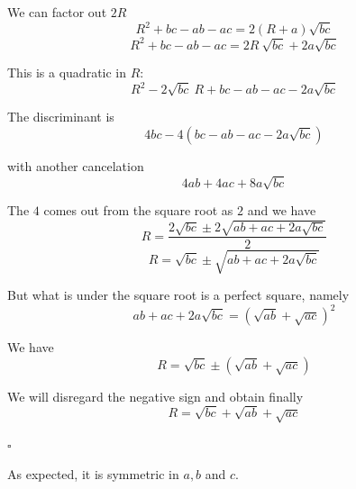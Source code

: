 \documentclass[11pt, oneside]{article}
\begin{document}
We can factor out $2R$
\[ R^2 + bc - ab - ac =  2 (R + a) \sqrt{bc} \]
\[ R^2 + bc - ab - ac =  2R \ \sqrt{bc} + 2a \sqrt{bc} \]

This is a quadratic in $R$:
\[ R^2 - 2 \sqrt{bc} \ R + bc - ab - ac - 2a \sqrt{bc} \]

The discriminant is
\[ 4bc - 4(bc - ab - ac - 2a \sqrt{bc}) \]

with another cancelation
\[ 4ab + 4ac + 8a \sqrt{bc} \]

The $4$ comes out from the square root as $2$ and we have
\[ R = \frac{2 \sqrt{bc} \pm 2 \sqrt{ab + ac + 2a \sqrt{bc}}}{2} \]
\[ R = \sqrt{bc} \pm \sqrt{ab + ac + 2a \sqrt{bc}} \]

But what is under the square root is a perfect square, namely
\[ ab + ac + 2a \sqrt{bc} = (\sqrt{ab} + \sqrt{ac})^2 \]

We have
\[ R = \sqrt{bc} \pm (\sqrt{ab} + \sqrt{ac}) \]

We will disregard the negative sign and obtain finally
\[ R = \sqrt{bc} + \sqrt{ab} + \sqrt{ac} \]

$\square$

As expected, it is symmetric in $a,b$ and $c$.
\end{document}
